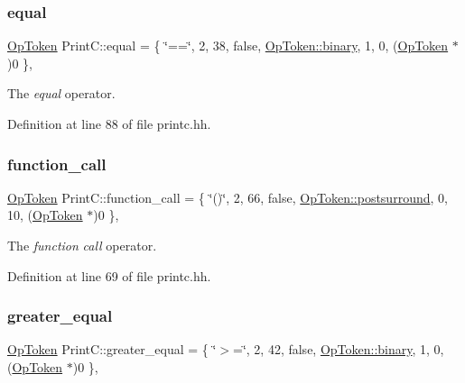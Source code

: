 \subsubsection{\texorpdfstring{equal}{equal}}
{\footnotesize\ttfamily \mbox{\hyperlink{class_op_token}{Op\+Token}} Print\+C\+::equal = \{ \char`\"{}==\char`\"{}, 2, 38, false, \mbox{\hyperlink{class_op_token_af41c7f108d5662ede7765c5a6c44eaffa3a2ec63522a9329a71ddbe8adc3e752d}{Op\+Token\+::binary}}, 1, 0, (\mbox{\hyperlink{class_op_token}{Op\+Token}} $\ast$)0 \}\hspace{0.3cm}{\ttfamily [static]}, {\ttfamily [protected]}}



The {\itshape equal} operator. 



Definition at line 88 of file printc.\+hh.

\mbox{\label{class_print_c_a808485afc527ab6629ad9193fe0db7f6}} 
\subsubsection{\texorpdfstring{function\_call}{function\_call}}
{\footnotesize\ttfamily \mbox{\hyperlink{class_op_token}{Op\+Token}} Print\+C\+::function\+\_\+call = \{ \char`\"{}()\char`\"{}, 2, 66, false, \mbox{\hyperlink{class_op_token_af41c7f108d5662ede7765c5a6c44eaffa82a30068870b08542e958e828d6464fa}{Op\+Token\+::postsurround}}, 0, 10, (\mbox{\hyperlink{class_op_token}{Op\+Token}} $\ast$)0 \}\hspace{0.3cm}{\ttfamily [static]}, {\ttfamily [protected]}}



The {\itshape function} {\itshape call} operator. 



Definition at line 69 of file printc.\+hh.

\mbox{\label{class_print_c_a6fa9b5b5fb7f70d5cd9c5de657a37a42}} 
\subsubsection{\texorpdfstring{greater\_equal}{greater\_equal}}
{\footnotesize\ttfamily \mbox{\hyperlink{class_op_token}{Op\+Token}} Print\+C\+::greater\+\_\+equal = \{ \char`\"{}$>$=\char`\"{}, 2, 42, false, \mbox{\hyperlink{class_op_token_af41c7f108d5662ede7765c5a6c44eaffa3a2ec63522a9329a71ddbe8adc3e752d}{Op\+Token\+::binary}}, 1, 0, (\mbox{\hyperlink{class_op_token}{Op\+Token}} $\ast$)0 \}\hspace{0.3cm}{\ttfamily [static]}, {\ttfamily [protected]}}



